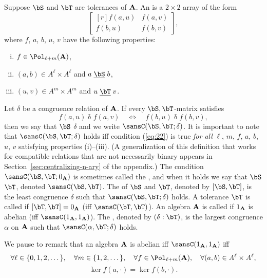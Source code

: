 Suppose $\bS$ and $\bT$ are tolerances of $\mathbf{A}$.  An  
is a $2\times 2$ array of the form
\[
\begin{bmatrix*}[r] f(a,u) & f(a,v)\\ f(b,u)&f(b,v)\end{bmatrix*},
\]
where $f$, $a$, $b$, $u$, $v$ have the following properties:
\begin{enumerate}[(i)]
\item $f\in \Pol_{\ell + m}(\bA)$,
\item $(a, b)\in A^\ell\times A^\ell$ and $a \mathrel{\underline{\bS}} b$,
\item $(u, v)\in A^m\times A^m$ and $u \mathrel{\underline{\bT}} v$.
\end{enumerate}
Let $\delta$ be a congruence relation of $\mathbf{A}$.
If every $\bS,\bT$-matrix satisfies
\begin{equation}
  \label{eq:22}
f(a,u) \mathrel{\delta} f(a,v)\quad \iff \quad f(b,u) \mathrel{\delta} f(b,v),
\end{equation}
then we say that $\bS$  $\delta$ and we write 
$\sansC(\bS, \bT; \delta)$.
It is important to note that $\sansC(\bS, \bT; \delta)$ holds iff condition
(\ref{eq:22}) is true \emph{for all}
$\ell$, $m$, $f$, $a$, $b$, $u$, $v$ satisfying properties (i)--(iii).
(A generalization of this definition that works for compatible relations that are not
necessarily binary appears in Section~\ref{sec:centralizing-n-ary} of the appendix.)
The condition $\sansC(\bS, \bT; 0_{\bA})$ is sometimes called the 
, and when it holds we say  that
$\bS$  $\bT$, denoted
$\sansC(\bS, \bT)$.
The  of $\bS$ and $\bT$, denoted by $[\bS, \bT]$,
is the least congruence $\delta$ such that $\sansC(\bS, \bT; \delta)$ 
holds.  A tolerance $\bT$ is called  if
$[\bT, \bT] = 0_\bA$ (iff $\sansC(\bT, \bT)$). 
An algebra $\mathbf{A}$ is called  if $1_{\mathbf{A}}$ is abelian
(iff $\sansC(1_\bA, 1_\bA)$).
The , denoted by
$(\delta : \bT )$, is the largest congruence $\alpha$ on $\mathbf{A}$ such that 
$\sansC(\alpha, \bT ; \delta)$ holds.

We pause to remark that an algebra $\mathbf{A}$ is abelian iff $\sansC(1_\bA, 1_\bA)$ iff
\[
\forall \ell \in \{0,1,2,\dots \}, 
\quad \forall m \in  \{1,2,\dots \},
\quad \forall f\in \Pol_{\ell + m}(\bA),
\quad \forall (a, b)\in A^\ell\times A^\ell,
\]
\[
\ker f(a, \cdot)=\ker f(b, \cdot).
\]

